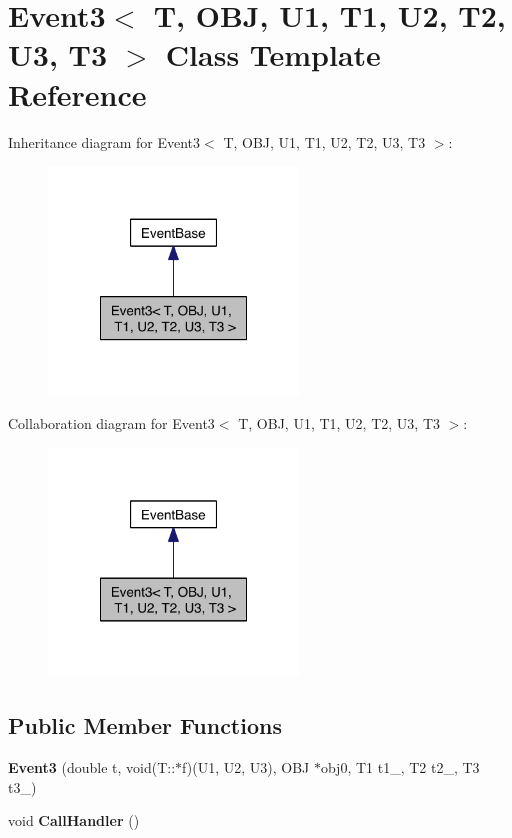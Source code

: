 \hypertarget{class_event3}{\section{Event3$<$ T, O\-B\-J, U1, T1, U2, T2, U3, T3 $>$ Class Template Reference}
\label{class_event3}
}


Inheritance diagram for Event3$<$ T, O\-B\-J, U1, T1, U2, T2, U3, T3 $>$\-:\nopagebreak
\begin{figure}[H]
\begin{center}
\leavevmode
\includegraphics[width=188pt]{class_event3__inherit__graph}
\end{center}
\end{figure}


Collaboration diagram for Event3$<$ T, O\-B\-J, U1, T1, U2, T2, U3, T3 $>$\-:\nopagebreak
\begin{figure}[H]
\begin{center}
\leavevmode
\includegraphics[width=188pt]{class_event3__coll__graph}
\end{center}
\end{figure}
\subsection*{Public Member Functions}
\begin{DoxyCompactItemize}
\item 
\hypertarget{class_event3_aab6870a823964c1843b897de6ce2057c}{{\bfseries Event3} (double t, void(T\-::$\ast$f)(U1, U2, U3), O\-B\-J $\ast$obj0, T1 t1\-\_, T2 t2\-\_, T3 t3\-\_)}\label{class_event3_aab6870a823964c1843b897de6ce2057c}

\item 
\hypertarget{class_event3_a1b9501d43723072952055c5abd9dc9be}{void {\bfseries Call\-Handler} ()}\label{class_event3_a1b9501d43723072952055c5abd9dc9be}

\end{DoxyCompactItemize}
